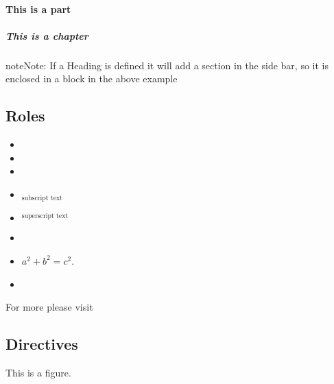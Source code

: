 \documentclass[letterpaper,10pt,english]{sphinxmanual}
\begin{document}
\paragraph{This is a part}
\label{\detokenize{usage:this-is-a-part}}

\subparagraph{This is a chapter}
\label{\detokenize{usage:this-is-a-chapter}}
\begin{sphinxadmonition}{note}{Note:}
\sphinxAtStartPar
If a Heading is defined it will add a section in the side bar, so it is enclosed in a block in the above example
\end{sphinxadmonition}


\subsection{Roles}
\label{\detokenize{usage:roles}}\begin{itemize}
\item {} 
\sphinxAtStartPar
{}

\item {} 
\sphinxAtStartPar
{}

\item {} 
\sphinxAtStartPar
{}

\item {} 
\sphinxAtStartPar
$_{\text{subscript text}}$

\item {} 
\sphinxAtStartPar
$^{\text{superscript text}}$

\item {} 
\sphinxAtStartPar
{}

\item {} 
\sphinxAtStartPar
\(a^2 + b^2 = c^2\).

\item {} 
\sphinxAtStartPar
{}

\end{itemize}

\sphinxAtStartPar
For more  please visit 


\subsection{Directives}
\label{\detokenize{usage:directives}}
\sphinxAtStartPar
This is a figure.
\end{document}
